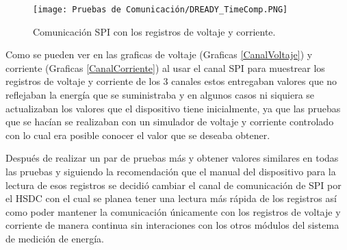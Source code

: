 \documentclass[letterpaper,12pt,oneside]{book}
\begin{document}
		\begin{figure}[!htpb]
			\centering
			\texttt{[image: Pruebas de Comunicación/DREADY\_TimeComp.PNG]}
			\caption[Comunicación SPI con los registros de voltaje y corriente]{Comunicación SPI con los registros de voltaje y corriente.}
			\label{ComSPI} 
		\end{figure}

		Como se pueden ver en las graficas de voltaje (Graficas \ref{CanalVoltaje}) y corriente (Graficas \ref{CanalCorriente}) al usar el canal SPI para muestrear los registros de voltaje y corriente de los 3 canales estos entregaban valores que no reflejaban la energía que se suministraba y en algunos casos ni siquiera se actualizaban los valores que el dispositivo tiene inicialmente, ya que las pruebas que se hacían se realizaban con un simulador de voltaje y corriente controlado con lo cual era posible conocer el valor que se deseaba obtener.

		Después de realizar un par de pruebas más y obtener valores similares en todas las pruebas y siguiendo la recomendación que el manual del dispositivo para la lectura de esos registros se decidió cambiar el canal de comunicación de SPI por el HSDC con el cual se planea tener una lectura más rápida de los registros así como poder mantener la comunicación únicamente con los registros de voltaje y corriente de manera continua sin interaciones con los otros módulos del sistema de medición de energía.
\end{document}
